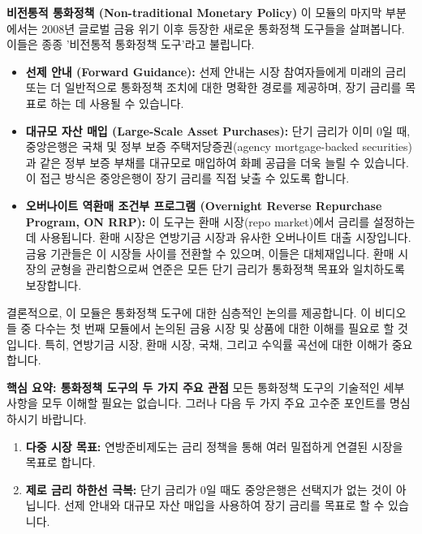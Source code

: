 \documentclass[11pt,a4paper]{article}
\begin{document}
\begin{conceptbox}
\textbf{비전통적 통화정책 (Non-traditional Monetary Policy)}
이 모듈의 마지막 부분에서는 2008년 글로벌 금융 위기 이후 등장한 새로운 통화정책 도구들을 살펴봅니다. 이들은 종종 '비전통적 통화정책 도구'라고 불립니다.
\begin{itemize}
    \item \textbf{선제 안내 (Forward Guidance):} 선제 안내는 시장 참여자들에게 미래의 금리 또는 더 일반적으로 통화정책 조치에 대한 명확한 경로를 제공하며, 장기 금리를 목표로 하는 데 사용될 수 있습니다.
    \item \textbf{대규모 자산 매입 (Large-Scale Asset Purchases):} 단기 금리가 이미 0일 때, 중앙은행은 국채 및 정부 보증 주택저당증권(agency mortgage-backed securities)과 같은 정부 보증 부채를 대규모로 매입하여 화폐 공급을 더욱 늘릴 수 있습니다. 이 접근 방식은 중앙은행이 장기 금리를 직접 낮출 수 있도록 합니다.
    \item \textbf{오버나이트 역환매 조건부 프로그램 (Overnight Reverse Repurchase Program, ON RRP):} 이 도구는 환매 시장(repo market)에서 금리를 설정하는 데 사용됩니다. 환매 시장은 연방기금 시장과 유사한 오버나이트 대출 시장입니다. 금융 기관들은 이 시장들 사이를 전환할 수 있으며, 이들은 대체재입니다. 환매 시장의 균형을 관리함으로써 연준은 모든 단기 금리가 통화정책 목표와 일치하도록 보장합니다.
\end{itemize}
\end{conceptbox}

결론적으로, 이 모듈은 통화정책 도구에 대한 심층적인 논의를 제공합니다. 이 비디오들 중 다수는 첫 번째 모듈에서 논의된 금융 시장 및 상품에 대한 이해를 필요로 할 것입니다. 특히, 연방기금 시장, 환매 시장, 국채, 그리고 수익률 곡선에 대한 이해가 중요합니다.

\begin{summarybox}
\textbf{핵심 요약: 통화정책 도구의 두 가지 주요 관점}
모든 통화정책 도구의 기술적인 세부 사항을 모두 이해할 필요는 없습니다. 그러나 다음 두 가지 주요 고수준 포인트를 명심하시기 바랍니다.
\begin{enumerate}
    \item \textbf{다중 시장 목표:} 연방준비제도는 금리 정책을 통해 여러 밀접하게 연결된 시장을 목표로 합니다.
    \item \textbf{제로 금리 하한선 극복:} 단기 금리가 0일 때도 중앙은행은 선택지가 없는 것이 아닙니다. 선제 안내와 대규모 자산 매입을 사용하여 장기 금리를 목표로 할 수 있습니다.
\end{enumerate}
\end{summarybox}
\end{document}
